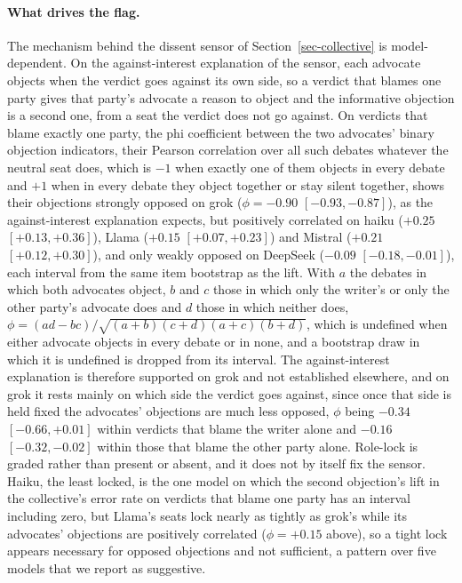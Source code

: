 \paragraph{What drives the flag.}
The mechanism behind the dissent sensor of Section~\ref{sec-collective} is
model-dependent. On the against-interest explanation of the sensor, each advocate
objects when the verdict goes against its own side, so a verdict that blames
one party gives that party's advocate a reason to object and the informative
objection is a second one, from a seat the verdict does not go against.
On verdicts that blame exactly one party, the phi coefficient
between the two advocates' binary objection indicators, their Pearson
correlation over all such debates whatever the neutral seat does, which is
$-1$ when exactly one of them objects in every debate and $+1$ when in every
debate they object together or stay silent together, shows their objections strongly opposed on grok
($\phi = -0.90$ $[-0.93, -0.87]$), as the against-interest explanation expects,
but positively correlated on haiku
($+0.25$ $[+0.13, +0.36]$), Llama ($+0.15$ $[+0.07, +0.23]$) and Mistral
($+0.21$ $[+0.12, +0.30]$), and only weakly opposed on DeepSeek ($-0.09$
$[-0.18, -0.01]$), each interval from the same item bootstrap as the lift.
With $a$ the debates in which both advocates object, $b$ and $c$ those in
which only the writer's or only the other party's advocate does and $d$ those
in which neither does, $\phi = (ad - bc)/\sqrt{(a+b)(c+d)(a+c)(b+d)}$, which
is undefined when either advocate objects in every debate or in none, and a
bootstrap draw in which it is undefined is dropped from its interval.
The against-interest explanation is therefore supported on grok and not
established elsewhere, and on grok it rests mainly on which side the verdict
goes against, since once that side is held fixed the advocates' objections
are much less opposed, $\phi$ being $-0.34$ $[-0.66, +0.01]$ within verdicts
that blame the writer alone and $-0.16$ $[-0.32, -0.02]$ within those that
blame the other party alone.
Role-lock is graded rather than present or absent, and it does not by itself
fix the sensor. Haiku, the least locked, is the one model on which the second
objection's lift in the collective's error rate on verdicts that blame one
party has an interval including zero, but Llama's seats lock nearly as
tightly as grok's while its advocates' objections are positively correlated
($\phi = +0.15$ above), so a tight lock appears necessary for opposed
objections and not sufficient, a pattern over five models that we report as
suggestive.

